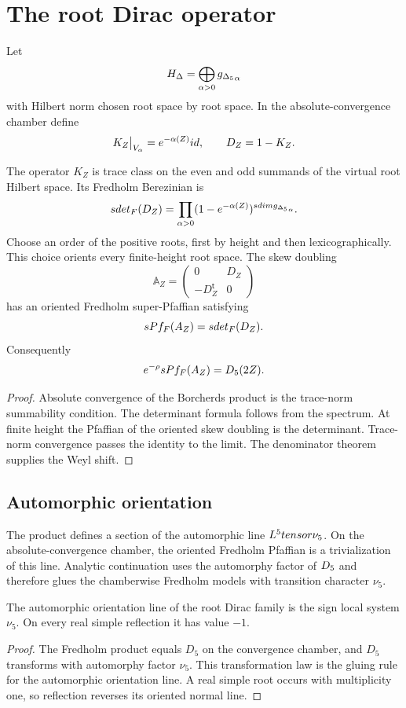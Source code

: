 \chapter{The root Dirac operator}
Let
\[
 H_\Delta=
 \bigoplus_{\alpha>0}{g_{\Delta_5}}_\alpha
\]
with Hilbert norm chosen root space by root space.  In the absolute-convergence chamber define
\[
 K_Z\big|_{V_\alpha}=e^{-\alpha(Z)}id,
 \qquad
 D_Z=1-K_Z.
\]

\begin{theorem}
The operator $K_Z$ is trace class on the even and odd summands of the virtual root Hilbert space.  Its Fredholm Berezinian is
\[
 sdet_F(D_Z)
 =\prod_{\alpha>0}(1-e^{-\alpha(Z)})^{sdim{g_{\Delta_5}}_\alpha}.
\]
Choose an order of the positive roots, first by height and then lexicographically.  This choice orients every finite-height root space.  The skew doubling
\[
 \mathbb A_Z=
 \begin{pmatrix}0&D_Z\\-D_Z^{\mathsf t}&0\end{pmatrix}
\]
has an oriented Fredholm super-Pfaffian satisfying
\[
 sPf_F(A_Z)=sdet_F(D_Z).
\]
Consequently
\[
 e^{-\rho}sPf_F(A_Z)={D_5}(2Z).
\]
\end{theorem}
\begin{proof}
Absolute convergence of the Borcherds product is the trace-norm summability condition.  The determinant formula follows from the spectrum.  At finite height the Pfaffian of the oriented skew doubling is the determinant.  Trace-norm convergence passes the identity to the limit.  The denominator theorem supplies the Weyl shift.
\end{proof}

\section{Automorphic orientation}
The product defines a section of the automorphic line $L^5tensor\nu_5$.  On the absolute-convergence chamber, the oriented Fredholm Pfaffian is a trivialization of this line.  Analytic continuation uses the automorphy factor of ${D_5}$ and therefore glues the chamberwise Fredholm models with transition character $\nu_5$.

\begin{corollary}
The automorphic orientation line of the root Dirac family is the sign local system $\nu_5$.  On every real simple reflection it has value $-1$.
\end{corollary}
\begin{proof}
The Fredholm product equals $D_5$ on the convergence chamber, and $D_5$ transforms with automorphy factor $\nu_5$.  This transformation law is the gluing rule for the automorphic orientation line.  A real simple root occurs with multiplicity one, so reflection reverses its oriented normal line.
\end{proof}

